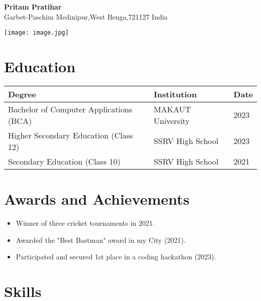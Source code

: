 \documentclass[a4paper,12pt]{article}
\begin{document}
\begin{minipage}{0.75\textwidth}
    {\LARGE \textbf{Pritam Pratihar}} \\
    Garbet-Paschim Medinipur,West Benga,721127 India \\ 
    
\end{minipage}
\begin{minipage}{0.2\textwidth}
    \raggedleft
    \texttt{[image: image.jpg]} %
\end{minipage}

\vspace{1cm}

\section*{Education}

\begin{tabular}{|p{}|p{}|p{}|}
\hline
\textbf{Degree} & \textbf{Institution} & \textbf{Date} \\
\hline
Bachelor of Computer Applications (BCA) & MAKAUT University & 2023 \\
\hline
Higher Secondary Education (Class 12) & SSRV High School & 2023 \\
\hline
Secondary Education (Class 10) & SSRV High School & 2021 \\
\hline
\end{tabular}

\vspace{0.5cm}

\section*{Awards and Achievements}
\begin{itemize}
    \item Winner of three cricket tournaments in 2021.
    \item Awarded the "Best Bastman" award in my City (2021).
    \item Participated and secured 1st place in a coding hackathon (2023).
\end{itemize}

\vspace{0.5cm}

\section*{Skills}
\end{document}
